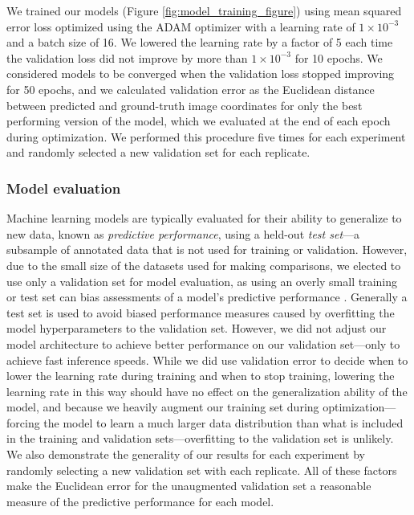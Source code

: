 \documentclass[11pt,a4paper,oneside]{article}
\begin{document}
We trained our models (Figure \ref{fig:model_training_figure}) using mean squared error loss optimized using the ADAM optimizer \citep{kingma2014adam} with a learning rate of $1\times10^{-3}$ and a batch size of 16. We lowered the learning rate by a factor of 5 each time the validation loss did not improve by more than $1\times10^{-3}$ for 10 epochs. We considered models to be converged when the validation loss stopped improving for 50 epochs, and we calculated validation error as the Euclidean distance between predicted and ground-truth image coordinates for only the best performing version of the model, which we evaluated at the end of each epoch during optimization. We performed this procedure five times for each experiment and randomly selected a new validation set for each replicate.

\subsubsection{Model evaluation}
Machine learning models are typically evaluated for their ability to generalize to new data, known as \textit{predictive performance}, using a held-out \textit{test set}—a subsample of annotated data that is not used for training or validation. However, due to the small size of the datasets used for making comparisons, we elected to use only a validation set for model evaluation, as using an overly small training or test set can bias assessments of a model's predictive performance \citep{kuhn2013applied}. Generally a test set is used to avoid biased performance measures caused by overfitting the model hyperparameters to the validation set. However, we did not adjust our model architecture to achieve better performance on our validation set—only to achieve fast inference speeds. While we did use validation error to decide when to lower the learning rate during training and when to stop training, lowering the learning rate in this way should have no effect on the generalization ability of the model, and because we heavily augment our training set during optimization---forcing the model to learn a much larger data distribution than what is included in the training and validation sets—overfitting to the validation set is unlikely. We also demonstrate the generality of our results for each experiment by randomly selecting a new validation set with each replicate. All of these factors make the Euclidean error for the unaugmented validation set a reasonable measure of the predictive performance for each model. 
\end{document}
